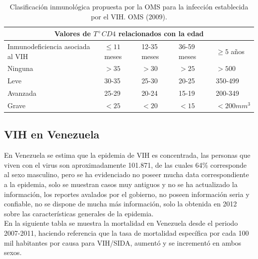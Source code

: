 \begin{table}[H]	
\begin{center}
\begin{tabular}{|l|l|l|l|l|}
\hline
\multicolumn{5}{|c|}{Valores de $T^{+}CD4$ relacionados con la edad} \\ \hline 
Inmunodeficiencia asociada al VIH & $\leq 11$ meses & 12-35 meses & 36-59 meses & $\geq 5$ a\~nos \\ \hline
Ninguna & $>35$ & $>30$ & $>25$ & $>500$ \\ \hline 
Leve & 30-35 & 25-30 & 20-25 & 350-499 \\ \hline
Avanzada & 25-29 & 20-24 & 15-19 & 200-349 \\ \hline
Grave & $<25$ & $<20$ & $<15$ & $<200mm^{3}$ \\ \hline

\end{tabular}
\caption{Clasificaci\'on inmunol\'ogica propuesta por la OMS para la infecci\'on establecida por el VIH. OMS (2009).}
\label{tabla:inmunologica}
\end{center}
\end{table}

\subsection{VIH en Venezuela}

	En Venezuela se estima que la epidemia de VIH es concentrada, las personas que viven con el virus son aproximadamente 101.871, de las cuales 64\% corresponde al sexo masculino, pero se ha evidenciado no poseer mucha data correspondiente a la epidemia, solo se muestran casos muy antiguos y no se ha actualizado la informaci\'on, los reportes avalados por el gobierno, no poseen informaci\'on seria y confiable, no se dispone de mucha m\'as informaci\'on, solo la obtenida en 2012 sobre las caracter\'isticas generales de la epidemia. \citet{narrative} \\
	
	En la siguiente tabla se muestra la mortalidad en Venezuela desde el periodo 2007-2011, haciendo referencia que la tasa de mortalidad espec\'ifica por cada 100 mil habitantes por causa para VIH/SIDA, aument\'o y se increment\'o en ambos sexos.
	
